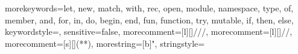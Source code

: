 		{morekeywords={let, new, match, with, rec, open, module, namespace, type, of, member, and, for, in, do, begin, end, fun, function, try, mutable, if, then, else},
     keywordstyle=\color{bluekeywords},
     sensitive=false,
     morecomment=[l][\color{greencomments}]{///},
     morecomment=[l][\color{greencomments}]{//},
     morecomment=[s][\color{greencomments}]{{(*}{*)}},
     morestring=[b]",
     stringstyle=\color{redstrings}
     }